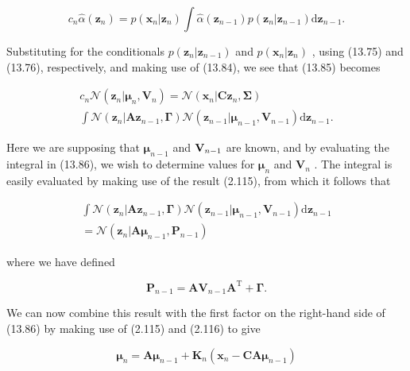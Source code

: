 \documentclass[
  10
]{article}
\begin{document}
\[
c _ {n} \widehat {\alpha} (\mathbf {z} _ {n}) = p (\mathbf {x} _ {n} | \mathbf {z} _ {n}) \int \widehat {\alpha} (\mathbf {z} _ {n - 1}) p (\mathbf {z} _ {n} | \mathbf {z} _ {n - 1}) \mathrm{d} \mathbf {z} _ {n - 1}.\tag{13.85}
\]

Substituting for the conditionals
\(p ( \mathbf { z } _ { n } | \mathbf { z } _ { n - 1 } )\) and
\(p ( \mathbf { x } _ { n } | \mathbf { z } _ { n } )\) , using (13.75)
and (13.76), respectively, and making use of (13.84), we see that
(13.85) becomes

\[
\begin{array}{l} c _ {n} \mathcal {N} (\mathbf {z} _ {n} | \boldsymbol {\mu} _ {n}, \mathbf {V} _ {n}) = \mathcal {N} (\mathbf {x} _ {n} | \mathbf {C z} _ {n}, \boldsymbol {\Sigma}) \\ \int \mathcal {N} (\mathbf {z} _ {n} | \mathbf {A z} _ {n - 1}, \boldsymbol {\Gamma}) \mathcal {N} (\mathbf {z} _ {n - 1} | \boldsymbol {\mu} _ {n - 1}, \mathbf {V} _ {n - 1})   \mathrm{d} \mathbf {z} _ {n - 1}. \end{array}\tag{13.86}
\]

Here we are supposing that \(\pmb { \mu } _ { n - 1 }\) and
\({ \bf V } _ { n - 1 }\) are known, and by evaluating the integral in
(13.86), we wish to determine values for \(\pmb { \mu } _ { n }\) and
\(\mathbf { V } _ { n }\) . The integral is easily evaluated by making
use of the result (2.115), from which it follows that

\[
\begin{array}{c} \int \mathcal {N} (\mathbf {z} _ {n} | \mathbf {A} \mathbf {z} _ {n - 1}, \boldsymbol {\Gamma}) \mathcal {N} (\mathbf {z} _ {n - 1} | \boldsymbol {\mu} _ {n - 1}, \mathbf {V} _ {n - 1})   \mathrm{d} \mathbf {z} _ {n - 1} \\ = \mathcal {N} (\mathbf {z} _ {n} | \mathbf {A} \boldsymbol {\mu} _ {n - 1}, \mathbf {P} _ {n - 1}) \end{array}\tag{13.87}
\]

where we have defined

\[
\mathbf {P} _ {n - 1} = \mathbf {A V} _ {n - 1} \mathbf {A} ^ {\mathrm{T}} + \boldsymbol {\Gamma}.\tag{13.88}
\]

We can now combine this result with the first factor on the right-hand
side of (13.86) by making use of (2.115) and (2.116) to give

\[
{\boldsymbol {\mu} _ {n}} = {\mathbf {A} \boldsymbol {\mu} _ {n - 1} + \mathbf {K} _ {n} (\mathbf {x} _ {n} - \mathbf {C A} \boldsymbol {\mu} _ {n - 1})}\tag{13.89}
\]
\end{document}
